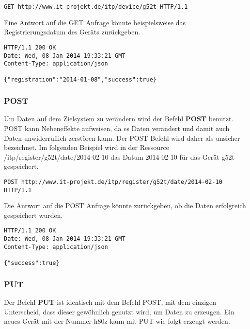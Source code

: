\begin{lstlisting}[caption={Beispiel HTTP GET Anfrage bei RESTful WebServices}]
GET http://www.it-projekt.de/itp/device/g52t HTTP/1.1
\end{lstlisting} 

Eine Antwort auf die GET Anfrage könnte beispielsweise das Registrierungsdatum des Geräts zurückgeben.

\begin{lstlisting}[caption={Beispiel Antwort auf die HTTP GET Anfrage}]
HTTP/1.1 200 OK
Date: Wed, 08 Jan 2014 19:33:21 GMT
Content-Type: application/json

{"registration":"2014-01-08","success":true}
\end{lstlisting} 

\subsubsection{POST}
Um Daten auf dem Zielsystem zu verändern wird der Befehl \textbf{POST} benutzt. POST kann Nebeneffekte aufweisen, da es Daten verändert und damit auch Daten unwiderruflich zerstören kann. Der POST Befehl wird daher als unsicher bezeichnet. Im folgenden Beispiel wird in der Ressource \dq{}/itp/register/g52t/date/2014-02-10\dq{} das Datum \dq{}2014-02-10\dq{} für das Gerät \dq{}g52t\dq{} gespeichert.

\begin{lstlisting}[caption={Beispiel HTTP POST Anfrage bei RESTful WebServices}]
POST http://www.it-projekt.de/itp/register/g52t/date/2014-02-10 HTTP/1.1
\end{lstlisting} 

Die Antwort auf die POST Anfrage könnte zurückgeben, ob die Daten erfolgreich gespeichert wurden.

\begin{lstlisting}[caption={Beispiel Antwort auf die HTTP POST Anfrage}]
HTTP/1.1 200 OK
Date: Wed, 08 Jan 2014 19:33:21 GMT
Content-Type: application/json

{"success":true}
\end{lstlisting} 

\subsubsection{PUT}
Der Befehl \textbf{PUT} ist identisch mit dem Befehl POST, mit dem einzigen Unterscheid, dass dieser gewöhnlich genutzt wird, um Daten zu erzeugen. Ein neues Gerät mit der Nummer \dq{}h80z\dq{} kann mit PUT wie folgt erzeugt werden.

